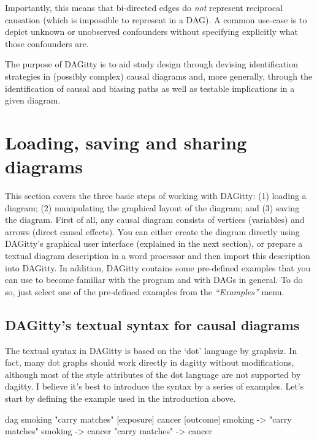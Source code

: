 \documentclass[a4paper]{article} %
\newcommand{\pp}{DAGitty\xspace}
\newcommand{\action}[1]{\emph{``#1''}}
\begin{document}
Importantly, this means that bi-directed edges do \emph{not} represent reciprocal causation (which is impossible to represent in a DAG). A common use-case is to depict unknown or unobserved confounders without specifying explicitly what those confounders are.

The purpose of \pp is to aid study design through devising identification
strategies in (possibly complex) causal diagrams and,
more generally, through the identification of causal and biasing paths as
well as testable implications in a given diagram. 

\section{Loading, saving  and sharing diagrams}

\label{sec:diagramcreation}

This section covers the three basic steps of working with \pp: 
(1) loading a diagram; (2) manipulating the graphical layout of the diagram; and
(3) saving the diagram. 
First of all, any causal diagram consists of vertices (variables) and arrows 
(direct causal effects).
You can either create the diagram directly using \pp's graphical user
interface (explained in the next section),
or prepare a textual diagram description in a word processor 
and then import this
description into \pp. In addition, \pp
contains some pre-defined examples that you can use to become familiar
with the program and with DAGs in general. 
To do so, just select one of the pre-defined examples from
the \action{Examples} menu.

\subsection{\pp's textual syntax for causal diagrams} 

The textual syntax in DAGitty is based on the ‘dot’ language by graphviz. In fact, many dot graphs should work directly in dagitty without modifications, although most of the style attributes of the dot language are not supported by dagitty.
I believe it's best to introduce the syntax by a series of examples. Let's start by defining the example used in the introduction above.

\begin{dagcode}
dag{ 
  smoking
  "carry matches" [exposure]
  cancer [outcome]
  smoking -> "carry matches"
  smoking -> cancer
  "carry matches" -> cancer
}
\end{dagcode}
\end{document}
